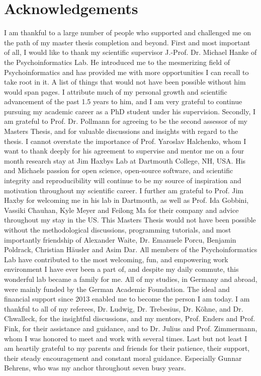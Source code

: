 \documentclass[a4paper, 12pt]{scrreprt}
\begin{document}
\chapter*{Acknowledgements}

I am thankful to a large number of people who supported and challenged me on the path of my master thesis completion and beyond. First and most important of all, I would like to thank my scientific supervisor J.-Prof. Dr. Michael Hanke of the Psychoinformatics Lab. He introduced me to the mesmerizing field of Psychoinformatics and has provided me with more opportunities I can recall to take root in it. A list of things that would not have been possible without him would span pages. I attribute much of my personal growth and scientific advancement of the past 1.5 years to him, and I am very grateful to continue pursuing my academic career as a PhD student under his supervision. \newline
Secondly, I am grateful to Prof. Dr. Pollmann for agreeing to be the second assessor of my Masters Thesis, and for valuable discussions and insights with regard to the thesis.\newline
I cannot overstate the importance of Prof. Yaroslav Halchenko, whom I want to thank deeply for his agreement to supervise and mentor me on a four month research stay at Jim Haxbys Lab at Dartmouth College, NH, USA. His and Michaels passion for open science, open-source software, and scientific integrity and reproducibility will continue to be my source of inspiration and motivation throughout my scientific career.\newline
I further am grateful to Prof. Jim Haxby for welcoming me in his lab in Dartmouth, as well as Prof. Ida Gobbini, Vassiki Chauhan, Kyle Meyer and Feilong Ma for their company and advice throughout my stay in the US. \newline
This Masters Thesis would not have been possible without the methodological discussions, programming tutorials, and most importantly friendship of Alexander Waite, Dr. Emanuele Porcu, Benjamin Poldrack, Christian Häusler and Asim Dar. All members of the Psychoinformatics Lab have contributed to the most welcoming, fun, and empowering work environment I have ever been a part of, and despite my daily commute, this wonderful lab became a family for me. \newline
All of my studies, in Germany and abroad, were mainly funded by the German Academic Foundation. The ideal and financial support since 2013 enabled me to become the person I am today. I am thankful to all of my referees, Dr. Ludwig, Dr. Trebesius, Dr. Köhne, and Dr. Chwalleck, for the insightful discussions, and my mentors, Prof. Enders and Prof. Fink, for their assistance and guidance, and to Dr. Julius and Prof. Zimmermann, whom I was honored to meet and work with several times. \newline
Last but not least I am heartily grateful to my parents and friends for their patience, their support, their steady encouragement and constant moral guidance. Especially Gunnar Behrens, who was my anchor throughout seven busy years.
\end{document}
